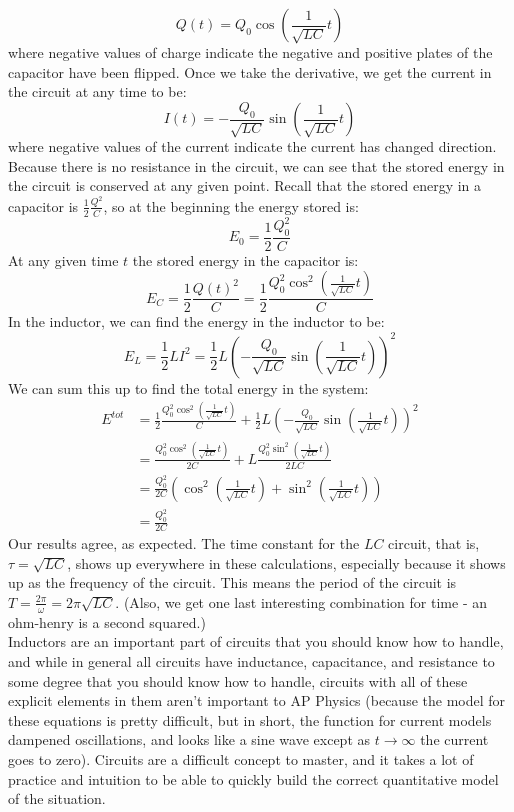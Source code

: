 \[
	Q(t) = Q_0\cos\left(\frac{1}{\sqrt{LC}}t\right)
\]
where negative values of charge indicate the negative and positive plates of the capacitor have been flipped. Once we take the derivative, we get the current in the circuit at any time to be:
\[
	I(t) = -\frac{Q_0}{\sqrt{LC}}\sin\left(\frac{1}{\sqrt{LC}}t\right)
\]
where negative values of the current indicate the current has changed direction. Because there is no resistance in the circuit, we can see that the stored energy in the circuit is conserved at any given point. Recall that the stored energy in a capacitor is $\frac{1}{2}\frac{Q^2}{C}$, so at the beginning the energy stored is:
\[
	E_{0} = \frac{1}{2}\frac{Q_0^2}{C}
\]
At any given time $t$ the stored energy in the capacitor is:
\[
	E_C = \frac{1}{2}\frac{Q(t)^2}{C} = \frac{1}{2}\frac{Q_0^2 \cos^2\left(\frac{1}{\sqrt{LC}}t\right)}{C}
\]
In the inductor, we can find the energy in the inductor to be:
\[
	E_L = \frac{1}{2}LI^2 = \frac{1}{2}L\left(-\frac{Q_0}{\sqrt{LC}}\sin\left(\frac{1}{\sqrt{LC}}t\right) \right)^2
\]
We can sum this up to find the total energy in the system:
\begin{align*}
	E^{tot} &= \frac{1}{2}\frac{Q_0^2 \cos^2\left(\frac{1}{\sqrt{LC}}t\right)}{C} + \frac{1}{2}L\left(-\frac{Q_0}{\sqrt{LC}}\sin\left(\frac{1}{\sqrt{LC}}t\right) \right)^2 \\
	&= \frac{Q_0^2 \cos^2\left(\frac{1}{\sqrt{LC}}t\right)}{2C} + L\frac{Q_0^2\sin^2\left(\frac{1}{\sqrt{LC}}t\right)}{2LC}\\
	&= \frac{Q_0^2}{2C}\left( \cos^2\left(\frac{1}{\sqrt{LC}}t\right) + \sin^2\left(\frac{1}{\sqrt{LC}}t\right)\right) \\
	&= \frac{Q_0^2}{2C}
\end{align*}
Our results agree, as expected. The time constant for the $LC$ circuit, that is, $\tau = \sqrt{LC}$, shows up everywhere in these calculations, especially because it shows up as the frequency of the circuit. This means the period of the circuit is $T = \frac{2\pi}{\omega} = 2\pi \sqrt{LC}$. (Also, we get one last interesting combination for time - an ohm-henry is a second squared.)\\
Inductors are an important part of circuits that you should know how to handle, and while in general all circuits have inductance, capacitance, and resistance to some degree that you should know how to handle, circuits with all of these explicit elements in them aren't important to AP Physics (because the model for these equations is pretty difficult, but in short, the function for current models dampened oscillations, and looks like a sine wave except as $t \to \infty$ the current goes to zero). Circuits are a difficult concept to master, and it takes a lot of practice and intuition to be able to quickly build the correct quantitative model of the situation.
